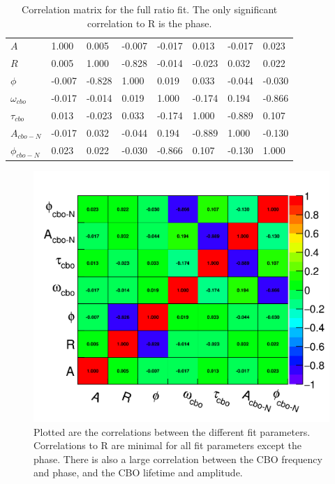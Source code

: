 	\begin{table}[]
	\setlength\tabcolsep{0pt}
	\begin{tabular*}{\linewidth}{@{\extracolsep{\fill}}lLBLLLLL}
	  \toprule
	            &  &  & \thead{$\phi$} &  &  &  &  \\
	  \midrule
		$A$    			 	 & 1.000 & 0.005 & -0.007 & -0.017 & 0.013 & -0.017 & 0.023  \\
		$R$     			 & 0.005 & 1.000 & -0.828 & -0.014 & -0.023 & 0.032 & 0.022  \\
		$\phi$   			 & -0.007 & -0.828 & 1.000 & 0.019 & 0.033 & -0.044 & -0.030  \\
		$\omega_{cbo}$   	 & -0.017 & -0.014 & 0.019 & 1.000 & -0.174 & 0.194 & -0.866  \\
		$\tau_{cbo}$ 		 & 0.013 & -0.023 & 0.033 & -0.174 & 1.000 & -0.889 & 0.107  \\
		$A_{cbo-N}$   	 	 & -0.017 & 0.032 & -0.044 & 0.194 & -0.889 & 1.000 & -0.130  \\
		$\phi_{cbo-N}$   	 & 0.023 & 0.022 & -0.030 & -0.866 & 0.107 & -0.130 & 1.000  \\
	  \bottomrule
	\end{tabular*}
	\caption{Correlation matrix for the full ratio fit. The only significant correlation to R is the \gmtwo phase.}
	\label{Tab:CorrMat}
	\end{table}

	\begin{figure}[]
		\centering
		\includegraphics[width=\textwidth]{CorrelationMatrix}
	    \caption[CorrelationMatrix]{Plotted are the correlations between the different fit parameters. Correlations to R are minimal for all fit parameters except the \gmtwo phase. There is also a large correlation between the CBO frequency and phase, and the CBO lifetime and amplitude.}
	    \label{fig:CorrelationMatrix}
	\end{figure}

